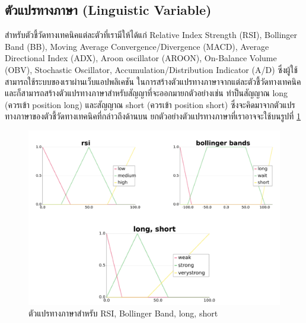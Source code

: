 \subsection{ตัวแปรทางภาษา (Linguistic Variable)}
สำหรับตัวชี้วัดทางเทคนิคแต่ละตัวที่เรามีให้ได้แก่ Relative Index Strength (RSI), Bollinger Band (BB), Moving Average Convergence/Divergence
(MACD), Average Directional Index (ADX), Aroon oscillator (AROON), On-Balance Volume (OBV), Stochastic Oscillator,
Accumulation/Distribution Indicator (A/D) ซึ่งผู้ใช้สามารถใช้ระบบของเราผ่านเว็บแอปพลิเคชัน ในการสร้างตัวแปรทางภาษาจากแต่ละตัวชี้วัดทางเทคนิค
และก็สามารถสร้างตัวแปรทางภาษาสำหรับสัญญาที่จะออกมายกตัวอย่างเช่น ทำป็นสัญญาณ long (ควรเข้า position long) และสัญญาณ short (ควรเข้า position short)
ซึ่งจะคิดมาจากตัวแปรทางภาษาของตัวชี้วัดทางเทคนิคที่กล่าวถึงด้านบน ยกตัวอย่างตัวแปรทางภาษาที่เราอาจจะใช้บนรูปที่ \ref{fig:8}
\begin{figure}[ht]
    \centering
    \includegraphics[width=\textwidth]{images/linguistic.png}
    \caption{ตัวแปรทางภาษาสำหรับ RSI, Bollinger Band, long, short}
    \label{fig:8}
\end{figure}


